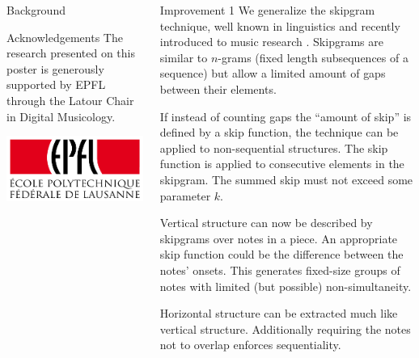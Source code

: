 \documentclass[final]{beamer}
\begin{document}
\begin{frame}[t]
\begin{columns}[t]
\begin{column}{0.3\textwidth}
\begin{block}{Background}
      \end{block}

      \vspace{5em}

      \begin{block}{Acknowledgements}
        The research presented on this poster is generously
        supported by EPFL through the Latour Chair in Digital Musicology.  

        \includegraphics[width=\textwidth]{img/Logo_EPFL.pdf}
      \end{block}
    \end{column}

    \begin{column}{0.3\textwidth}
      \begin{block}{Improvement 1}
        We generalize the \alert{skipgram technique},
        well known in linguistics \autocite{GuthrieCloserLookSkipGram2006}
        and recently introduced to music research \autocite{SearsModelingHarmonySkipGrams2017}.
        Skipgrams are similar to $n$-grams (fixed length subsequences of a sequence)
        but allow a limited amount of \alert{gaps} between their elements.

        If instead of counting gaps the \enquote{amount of skip} is defined by a
        \alert{skip function}, the technique can be applied to non-sequential structures.
        The skip function is applied to consecutive elements in the skipgram.
        The summed skip must not exceed some parameter $k$.

        Vertical structure can now be described by \alert{skipgrams over notes} in a piece.
        An appropriate skip function could be the difference between the notes' onsets.
        This generates fixed-size groups of notes with \alert{limited} (but possible)
        \alert{non-simultaneity}.

        Horizontal structure can be extracted much like vertical structure.
        Additionally requiring the notes not to overlap enforces \alert{sequentiality}.


\end{block}
\end{column}
\end{columns}
\end{frame}
\end{document}
